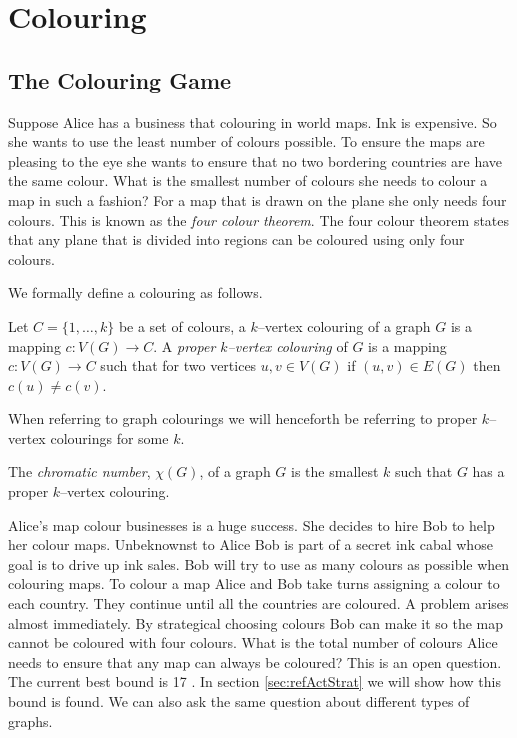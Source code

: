 \chapter{Colouring}

\section{The Colouring Game}

Suppose Alice has a business that colouring in world maps. Ink is expensive. So she wants to use the least number of colours possible. To ensure the maps are pleasing to the eye she wants to ensure that no two bordering countries are have the same colour. What is the smallest number of colours she needs to colour a map in such a fashion? For a map that is drawn on the plane she only needs four colours. This is known as the \textit{four colour theorem}. The four colour theorem states that any plane that is divided into regions can be coloured using only four colours. 

We formally define a colouring as follows.
\begin{definition}
Let $C=\{1,\dots,k\}$ be a set of colours, a $k$--vertex colouring of a graph $G$ is a mapping $c\colon V(G) \to C$. A \textit{proper $k$--vertex colouring} of $G$ is a mapping $c\colon V(G) \to C$ such that for two vertices $u,v\in V(G)$ if $(u,v)\in E(G)$ then $c(u)\neq c(v)$. 
\end{definition}
When referring to graph colourings we will henceforth be referring to proper $k$--vertex colourings for some $k$. 
\begin{definition}
The \textit{chromatic number}, $\chi(G)$, of a graph $G$ is the smallest $k$ such that $G$ has a proper $k$--vertex colouring.
\end{definition} 

Alice's map colour businesses is a huge success. She decides to hire Bob to help her colour maps. Unbeknownst to Alice Bob is part of a secret ink cabal whose goal is to drive up ink sales. Bob will try to use as many colours as possible when colouring maps. To colour a map Alice and Bob take turns assigning a colour to each country. They continue until all the countries are coloured. A problem arises almost immediately. By strategical choosing colours Bob can make it so the map cannot be coloured with four colours. What is the total number of colours Alice needs to ensure that any map can always be coloured? This is an open question. The current best bound is 17 \cite{Zhu2008}. In section \ref{sec:refActStrat} we will show how this bound is found. We can also ask the same question about different types of graphs. 

